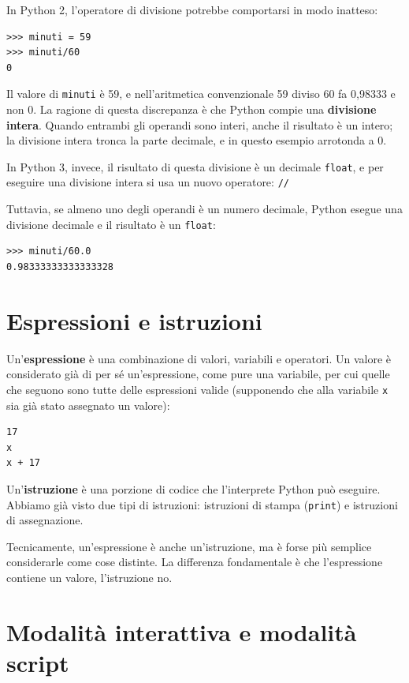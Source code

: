 \documentclass[10pt]{book}
\begin{document}
In Python 2, l'operatore di divisione potrebbe comportarsi in modo inatteso:

\begin{verbatim}
>>> minuti = 59
>>> minuti/60
0
\end{verbatim}
%
Il valore di {\tt minuti} è 59, e nell'aritmetica convenzionale 59 diviso 60 fa 0,98333 e non 0. La ragione di questa discrepanza è che Python compie una {\bf divisione intera}. Quando entrambi gli operandi sono interi, anche il risultato è un intero; la divisione intera tronca la parte decimale, e in questo esempio arrotonda a 0.

In Python 3, invece, il risultato di questa divisione è un decimale {\tt float}, e per eseguire una divisione intera si usa un nuovo operatore: {\tt //}

Tuttavia, se almeno uno degli operandi è un numero decimale, Python esegue una divisione decimale e il risultato è un {\tt float}:

\begin{verbatim}
>>> minuti/60.0
0.98333333333333328
\end{verbatim}


\section{Espressioni e istruzioni}

Un'{\bf espressione} è una combinazione di valori, variabili e operatori. Un valore è considerato già di per sé un'espressione, come pure una variabile, per cui quelle che seguono sono tutte delle espressioni valide (supponendo che alla variabile {\tt x} sia già stato assegnato un valore):

\begin{verbatim}
17
x
x + 17
\end{verbatim}
%
Un'{\bf istruzione} è una porzione di codice che l'interprete Python può eseguire. Abbiamo già visto due tipi di istruzioni: istruzioni di stampa ({\tt print}) e istruzioni di assegnazione.

Tecnicamente, un'espressione è anche un'istruzione, ma è forse più semplice considerarle come cose distinte. La differenza fondamentale è che l'espressione contiene un valore, l'istruzione no.


\section{Modalità interattiva e modalità script}
\end{document}
